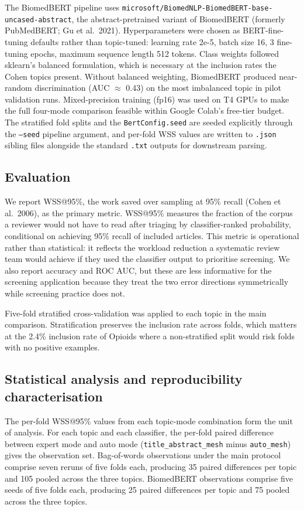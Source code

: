 \documentclass[11pt,a4paper]{article}
\begin{document}
The BiomedBERT pipeline uses \texttt{microsoft/BiomedNLP-BiomedBERT-base-uncased-abstract}, the abstract-pretrained variant of BiomedBERT (formerly PubMedBERT; Gu et al.\ 2021). Hyperparameters were chosen as BERT-fine-tuning defaults rather than topic-tuned: learning rate 2e-5, batch size 16, 3 fine-tuning epochs, maximum sequence length 512 tokens. Class weights followed sklearn's balanced formulation, which is necessary at the inclusion rates the Cohen topics present. Without balanced weighting, BiomedBERT produced near-random discrimination (AUC $\approx$ 0.43) on the most imbalanced topic in pilot validation runs. Mixed-precision training (fp16) was used on T4 GPUs to make the full four-mode comparison feasible within Google Colab's free-tier budget. The stratified fold splits and the \texttt{BertConfig.seed} are seeded explicitly through the \texttt{--seed} pipeline argument, and per-fold WSS values are written to \texttt{.json} sibling files alongside the standard \texttt{.txt} outputs for downstream parsing.

\subsection{Evaluation}

We report WSS@95\%, the work saved over sampling at 95\% recall (Cohen et al.\ 2006), as the primary metric. WSS@95\% measures the fraction of the corpus a reviewer would not have to read after triaging by classifier-ranked probability, conditional on achieving 95\% recall of included articles. This metric is operational rather than statistical: it reflects the workload reduction a systematic review team would achieve if they used the classifier output to prioritise screening. We also report accuracy and ROC AUC, but these are less informative for the screening application because they treat the two error directions symmetrically while screening practice does not.

Five-fold stratified cross-validation was applied to each topic in the main comparison. Stratification preserves the inclusion rate across folds, which matters at the 2.4\% inclusion rate of Opioids where a non-stratified split would risk folds with no positive examples.

\subsection{Statistical analysis and reproducibility characterisation}

The per-fold WSS@95\% values from each topic-mode combination form the unit of analysis. For each topic and each classifier, the per-fold paired difference between expert mode and auto mode (\texttt{title\_abstract\_mesh} minus \texttt{auto\_mesh}) gives the observation set. Bag-of-words observations under the main protocol comprise seven reruns of five folds each, producing 35 paired differences per topic and 105 pooled across the three topics. BiomedBERT observations comprise five seeds of five folds each, producing 25 paired differences per topic and 75 pooled across the three topics.
\end{document}
